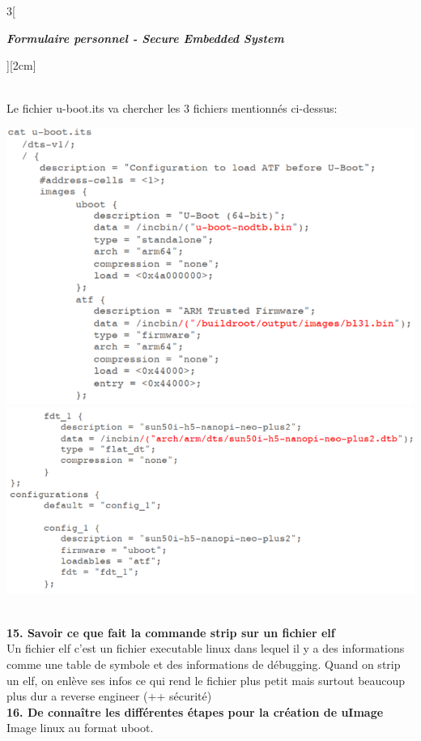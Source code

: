 \begin{multicols}{3}[\centerline{ \large\em \textbf{Formulaire personnel - Secure Embedded System}}][2cm]
\begin{minipage}{\linewidth}
\end{minipage}\\
Le fichier u-boot.its va chercher les 3 fichiers mentionnés ci-dessus:\\
\begin{minipage}{\linewidth}
	\centering
    \includegraphics[width =0.8\columnwidth]{images/14.png}
    \includegraphics[width =0.8\columnwidth]{images/15.png}
\end{minipage}
\\ \textbf{15. Savoir ce que fait la commande strip sur un fichier elf\\}
Un fichier elf c'est un fichier executable linux dans lequel il y a des informations comme une table de symbole et des informations de débugging. Quand on strip un elf, on enlève ses infos ce qui rend le fichier plus petit mais surtout beaucoup plus dur a reverse engineer (++ sécurité)
\\ \textbf{16. De connaître les différentes étapes pour la création de uImage\\}
Image linux au format uboot.\\


\end{multicols}
